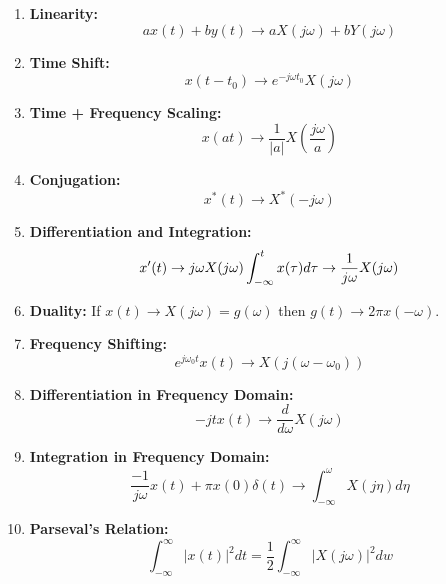\documentclass[a4paper,12pt]{report}
\begin{document}
\begin{enumerate}
\item \textbf{Linearity: } \begin{equation}
ax(t) + by(t) \to aX(j\omega) + bY(j\omega)
\end{equation}

\item \textbf{Time Shift: } \begin{equation}
x(t-t_0) \to e^{-j\omega t_0} X(j\omega)
\end{equation}

\item \textbf{Time + Frequency Scaling: } \begin{equation}
x(at) \to \frac{1}{|a|} X(\frac{j\omega}{a})
\end{equation}

\item \textbf{Conjugation: } \begin{equation}
x^*(t) \to X^*(-j\omega)
\end{equation}

\item \textbf{Differentiation and Integration: } \begin{equation}
x'(t) \to j\omega X(j\omega) \\
\int_{-\infty}^{t} x(\tau) d\tau \to \frac{1}{j\omega} X(j\omega)
\end{equation}

\item \textbf{Duality: } If $x(t) \to X(j\omega) = g(\omega)$ then $g(t) \to 2\pi x(-\omega)$.

\item \textbf{Frequency Shifting: } \begin{equation}
e^{j\omega_0 t} x(t) \to X(j(\omega-\omega_0))
\end{equation}


\item \textbf{Differentiation in Frequency Domain: } \begin{equation}
-jtx(t) \to \frac{d}{d\omega} X(j\omega)
\end{equation}



\item \textbf{Integration in Frequency Domain: } \begin{equation}
\frac{-1}{j\omega} x(t) + \pi x(0) \delta(t) \to \int_{-\infty}^{\omega} X(j\eta) d\eta
\end{equation}

\item \textbf{Parseval's Relation: } \begin{equation}
\int_{-\infty}^{\infty} |x(t)|^2 dt = \frac{1}{2} \int_{-\infty}^{\infty} |X(j\omega)|^2 dw
\end{equation}

\end{enumerate}
\end{document}
